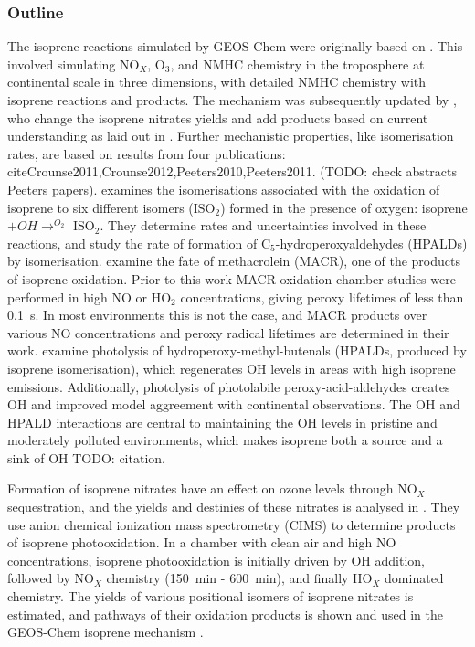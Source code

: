     \subsubsection{Outline}
      The isoprene reactions simulated by GEOS-Chem were originally based on \cite{Horowitz1998}.
      This involved simulating NO$_X$, O$_3$, and NMHC chemistry in the troposphere at continental scale in three dimensions, with detailed NMHC chemistry with isoprene reactions and products.
      The mechanism was subsequently updated by \citet{Mao2013}, who change the isoprene nitrates yields and add products based on current understanding as laid out in \citet{Paulot2009a,Paulot2009b}.
      Further mechanistic properties, like isomerisation rates, are based on results from four publications: cite{Crounse2011,Crounse2012,Peeters2010,Peeters2011}.
      (TODO: check abstracts Peeters papers).
      \cite{Crounse2011} examines the isomerisations associated with the oxidation of isoprene to six different isomers (ISO$_2$) formed in the presence of oxygen: isoprene $ + OH \rightarrow^{O_2} $ ISO$_2$.
      They determine rates and uncertainties involved in these reactions, and study the rate of formation of C$_5$-hydroperoxyaldehydes (HPALDs) by isomerisation.
      \cite{Crounse2012} examine the fate of methacrolein (MACR), one of the products of isoprene oxidation. 
      Prior to this work MACR oxidation chamber studies were performed in high NO or HO$_2$ concentrations, giving peroxy lifetimes of less than 0.1~s.
      In most environments this is not the case, and MACR products over various NO concentrations and peroxy radical lifetimes are determined in their work.
      \cite{Peeters2010} examine photolysis of hydroperoxy-methyl-butenals (HPALDs, produced by isoprene isomerisation), which regenerates OH levels in areas with high isoprene emissions.
      Additionally, photolysis of photolabile peroxy-acid-aldehydes creates OH and improved model aggreement with continental observations.
      The OH and HPALD interactions are central to maintaining the OH levels in pristine and moderately polluted environments, which makes isoprene both a source and a sink of OH TODO: citation.
      
      Formation of isoprene nitrates have an effect on ozone levels through NO$_X$ sequestration, and the yields and destinies of these nitrates is analysed in \citet{Paulot2009a}. 
      They use anion chemical ionization mass spectrometry (CIMS) to determine products of isoprene photooxidation.
      In a chamber with clean air and high NO concentrations, isoprene photooxidation is initially driven by OH addition, followed by NO$_X$ chemistry (150~min - 600~min), and finally HO$_X$ dominated chemistry.
      The yields of various positional isomers of isoprene nitrates is estimated, and pathways of their oxidation products is shown and used in the GEOS-Chem isoprene mechanism \citep{Paulot2009a,Mao2013}. 
      
